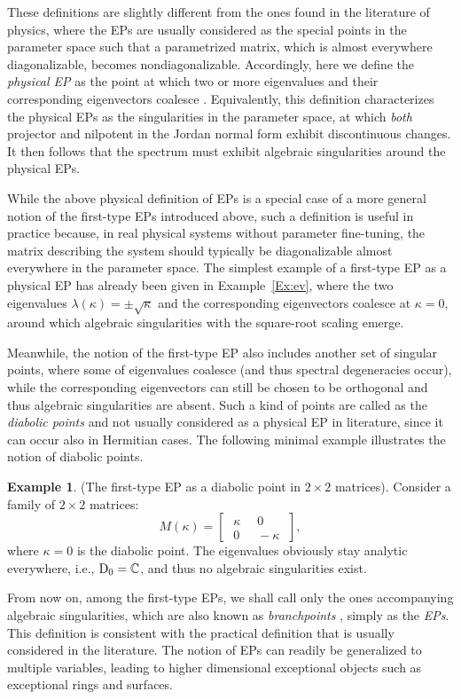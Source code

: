 \documentclass{tADP2e}
\theoremstyle{plain}
\theoremstyle{plain}
\theoremstyle{definition}
\newtheorem{example}{Example}[section]
\newcommand{\exmp}[1]{
\begin{example}
	#1
\end{example}
}
\begin{document}
\vspace{3pt}
\noindent 
These definitions are slightly different from the ones found in the literature of physics, where the EPs are usually considered as the special points in the parameter space such that a parametrized matrix, which is almost everywhere diagonalizable, becomes nondiagonalizable. Accordingly, here we define the {\it physical EP} as the point at which two or more eigenvalues and their corresponding eigenvectors coalesce \cite{Berry2004,Heiss_2004}. Equivalently, this definition characterizes the physical EPs as the singularities in the parameter space, at which {\it both} projector and nilpotent in the Jordan normal form exhibit  discontinuous changes. It then follows that the spectrum must exhibit algebraic singularities around the physical EPs.

While the above physical definition of EPs is a special case of a more general notion of the first-type EPs introduced above, such a definition is useful in practice because, in real physical systems without parameter fine-tuning, the matrix describing the system should typically be diagonalizable almost everywhere in the parameter space. 
The simplest example of a first-type EP as a physical EP has already been given in Example~\ref{Ex:ev}, where the two eigenvalues $\lambda(\kappa)=\pm\sqrt{\kappa}$ and the corresponding eigenvectors coalesce at $\kappa=0$, around which algebraic singularities with the square-root scaling emerge.

Meanwhile, the notion of the first-type EP also includes another set of singular points, where some of eigenvalues coalesce (and thus spectral degeneracies occur), while the corresponding eigenvectors can  still be chosen to be orthogonal and thus algebraic singularities are absent. Such a kind of points are called as the {\it diabolic points} \cite{YDR96} and not usually considered as a physical EP in   literature, since it can occur also in Hermitian cases. The following minimal example illustrates the notion of diabolic points.

\exmp{(The first-type EP as a diabolic point in $2\times 2$ matrices). 
\label{Ex:1EP}
Consider a family of $2\times 2$ matrices: 
\begin{equation}
M(\kappa)=\begin{bmatrix} \;\kappa\; & \;0\; \\ \;0\; & \;-\kappa\; \end{bmatrix}, 
\label{EPsz}
\end{equation}
where $\kappa=0$ is the diabolic point. The eigenvalues obviously stay analytic everywhere, i.e., ${\rm D}_0=\mathbb{C}$, and thus no algebraic singularities exist. 
}
\noindent From now on, among the first-type EPs, we shall call only the ones accompanying algebraic singularities, which are also known as \emph{branchpoints} \cite{HD16},  simply as the {\it EPs}. This definition is  consistent with the practical definition that is usually considered in the literature. The notion of EPs can readily be generalized to multiple variables,  leading to higher dimensional exceptional objects such as exceptional rings and surfaces.
\end{document}
